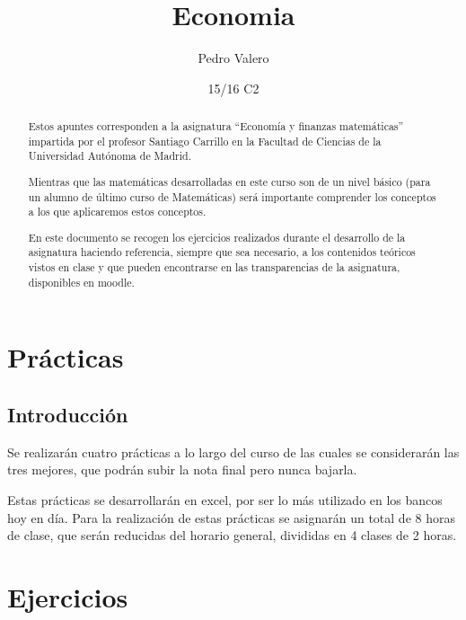 \documentclass{apuntes}
\title{Economia}
\author{Pedro Valero}
\date{15/16 C2}
\begin{document}
\pagestyle{plain}

\begin{abstract}
Estos apuntes corresponden a la asignatura ``Economía y finanzas matemáticas'' impartida por el profesor Santiago Carrillo en la Facultad de Ciencias de la Universidad Autónoma de Madrid.

Mientras que las matemáticas desarrolladas en este curso son de un nivel básico (para un alumno de último curso de Matemáticas) será importante comprender los conceptos a los que aplicaremos estos conceptos.

En este documento se recogen los ejercicios realizados durante el desarrollo de la asignatura haciendo referencia, siempre que sea necesario, a los contenidos teóricos vistos en clase y que pueden encontrarse en las transparencias de la asignatura, disponibles en moodle.
\end{abstract}

\maketitle

\tableofcontents
\newpage

\appendix

\chapter{Prácticas}
\section{Introducción}
Se realizarán cuatro prácticas a lo largo del curso de las cuales se considerarán las tres mejores, que podrán subir la nota final pero nunca bajarla.

Estas prácticas se desarrollarán en excel, por ser lo más utilizado en los bancos hoy en día. Para la realización de estas prácticas se asignarán un total de 8 horas de clase, que serán reducidas del horario general, divididas en 4 clases de 2 horas.

\chapter{Ejercicios}

\printindex
\end{document}
